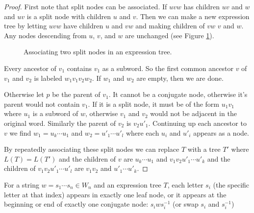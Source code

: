 \documentclass[12pt]{thesis}
\begin{document}
\begin{proof}
    First note that split nodes can be associated.
    If $uvw$ has children $uv$ and $w$
    and $uv$ is a split node with children $u$ and $v$.
    Then we can make a new expression
    tree by letting $uvw$ have children $u$ and $vw$
    and making children of $vw$ $v$ and $w$.
    Any nodes descending from $u$, $v$, and $w$ are unchanged (see Figure \ref{fig:expression-tree}).

    \begin{figure}[h]
        \centering
        \def\svgwidth{6cm}
        
        \caption{Associating two split nodes in an expression tree.}
        \label{fig:expression-tree}
    \end{figure}

    Every ancestor of $v_{1}$ contains $v_{1}$ as a subword.
    So the first common ancestor $v$ of $v_{1}$ and $v_{2}$
    is labeled  $w_{1}v_{1}v_{2}w_{2}$.
    If $w_{1}$ and $w_{2}$ are empty, then we are done.

    Otherwise let $p$ be the parent of $v_{1}$.
    It cannot be a conjugate node,
    otherwise it's parent would not contain $v_{1}$.
    If it is a split node, it must be of the form
    $u_{1} v_{1}$ where $u_{1}$ is a subword of $w$,
    otherwise $v_{1}$ and $v_{2}$
    would not be adjacent in the original word.
    Similarly the parent of $v_{2}$ is $v_{2} u'_{1}$.
    Continuing up each ancestor to $v$
    we find $w_{1} = u_{k} \cdots u_{1}$ and
    $w_{2} = u'_{1} \cdots u'_{l}$
    where each $u_{i}$ and $u'_{i}$
    appears as a node.

    By repeatedly associating these split nodes we can replace $T$
    with a tree $T'$
    where $L(T) = L(T')$
    and the children of $v$
    are $u_{k} \cdots u_{1}$ and
    $v_{1}v_{2} u'_{1} \cdots u'_{k}$
    and the children of $v_{1}v_{2} u'_{1} \cdots u'_{l}$
    are $v_{1}v_{2}$ and $u'_{1} \cdots u'_{k}$.
\end{proof}

\begin{proposition}
    \label{prop:letters-in-tree}
    For a string $w = s_{1} \cdots s_{n} \in W_{n}$
    and an expression tree $T$,
    each letter $s_{i}$ (the specific letter at that index) appears
    in exactly one leaf node,
    or it appears at the beginning
    or end of exactly one conjugate node:
    $s_{i}ws_{i}^{-1}$ (or swap $s_{i}$ and $s_{i}^{-1}$)
\end{proposition}
\end{document}
